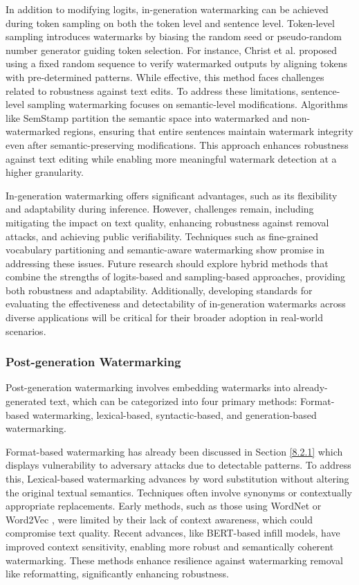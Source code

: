 In addition to modifying logits, in-generation watermarking can be achieved during token sampling on both the token level and sentence level. Token-level sampling introduces watermarks by biasing the random seed or pseudo-random number generator guiding token selection. For instance, Christ et al. \cite{christ2024undetectable} proposed using a fixed random sequence to verify watermarked outputs by aligning tokens with pre-determined patterns. While effective, this method faces challenges related to robustness against text edits. To address these limitations, sentence-level sampling watermarking focuses on semantic-level modifications. Algorithms like SemStamp \cite{hou2023semstamp} partition the semantic space into watermarked and non-watermarked regions, ensuring that entire sentences maintain watermark integrity even after semantic-preserving modifications. This approach enhances robustness against text editing while enabling more meaningful watermark detection at a higher granularity.

In-generation watermarking offers significant advantages, such as its flexibility and adaptability during inference. However, challenges remain, including mitigating the impact on text quality, enhancing robustness against removal attacks, and achieving public verifiability. Techniques such as fine-grained vocabulary partitioning \cite{fernandez2023three} and semantic-aware watermarking \cite{fu2024watermarking} show promise in addressing these issues.
Future research should explore hybrid methods that combine the strengths of logits-based and sampling-based approaches, providing both robustness and adaptability. Additionally, developing standards for evaluating the effectiveness and detectability of in-generation watermarks across diverse applications will be critical for their broader adoption in real-world scenarios.


\subsubsection{Post-generation Watermarking} 
Post-generation watermarking involves embedding watermarks into already-generated text, which can be categorized into four primary methods: Format-based watermarking, lexical-based, syntactic-based, and generation-based watermarking\cite{liu2024survey}.  

Format-based watermarking has already been discussed in  Section \ref{8.2.1}  which displays vulnerability to adversary attacks due to detectable patterns. To address this,  Lexical-based watermarking advances by word substitution without altering the original textual semantics. Techniques often involve synonyms or contextually appropriate replacements. Early methods, such as those using WordNet or Word2Vec \cite{topkara2006hiding,fellbaum1998wordnet, mitchell2023detectgpt}, were limited by their lack of context awareness, which could compromise text quality. Recent advances, like BERT-based infill models\cite{yang2022tracing, yoo-etal-2023-robust}, have improved context sensitivity, enabling more robust and semantically coherent watermarking. These methods enhance resilience against watermarking removal like reformatting, significantly enhancing robustness.

